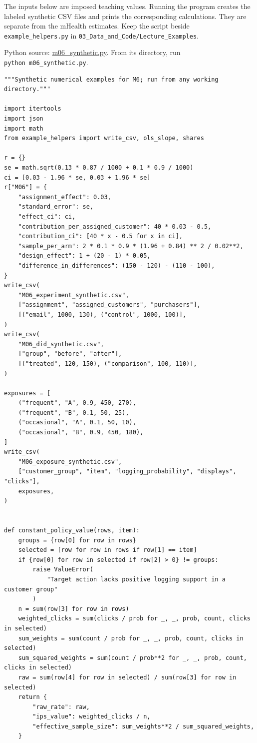 \noindent The inputs below are imposed teaching values. Running the program
creates the labeled synthetic CSV files and prints the corresponding
calculations. They are separate from the mHealth estimates. Keep the
script beside \texttt{example\_helpers.py} in
\texttt{03\_Data\_and\_Code/Lecture\_Examples}.

\FloatBarrier
{}
Python source:
\href{../03_Data_and_Code/Lecture_Examples/m06_synthetic.py}{m06\_synthetic.py}.
From its directory, run \texttt{python\ m06\_synthetic.py}.

\begin{Verbatim}[breaklines,breakanywhere,fontsize=\small]
"""Synthetic numerical examples for M6; run from any working directory."""

import itertools
import json
import math
from example_helpers import write_csv, ols_slope, shares

r = {}
se = math.sqrt(0.13 * 0.87 / 1000 + 0.1 * 0.9 / 1000)
ci = [0.03 - 1.96 * se, 0.03 + 1.96 * se]
r["M06"] = {
    "assignment_effect": 0.03,
    "standard_error": se,
    "effect_ci": ci,
    "contribution_per_assigned_customer": 40 * 0.03 - 0.5,
    "contribution_ci": [40 * x - 0.5 for x in ci],
    "sample_per_arm": 2 * 0.1 * 0.9 * (1.96 + 0.84) ** 2 / 0.02**2,
    "design_effect": 1 + (20 - 1) * 0.05,
    "difference_in_differences": (150 - 120) - (110 - 100),
}
write_csv(
    "M06_experiment_synthetic.csv",
    ["assignment", "assigned_customers", "purchasers"],
    [("email", 1000, 130), ("control", 1000, 100)],
)
write_csv(
    "M06_did_synthetic.csv",
    ["group", "before", "after"],
    [("treated", 120, 150), ("comparison", 100, 110)],
)

exposures = [
    ("frequent", "A", 0.9, 450, 270),
    ("frequent", "B", 0.1, 50, 25),
    ("occasional", "A", 0.1, 50, 10),
    ("occasional", "B", 0.9, 450, 180),
]
write_csv(
    "M06_exposure_synthetic.csv",
    ["customer_group", "item", "logging_probability", "displays", "clicks"],
    exposures,
)


def constant_policy_value(rows, item):
    groups = {row[0] for row in rows}
    selected = [row for row in rows if row[1] == item]
    if {row[0] for row in selected if row[2] > 0} != groups:
        raise ValueError(
            "Target action lacks positive logging support in a customer group"
        )
    n = sum(row[3] for row in rows)
    weighted_clicks = sum(clicks / prob for _, _, prob, count, clicks in selected)
    sum_weights = sum(count / prob for _, _, prob, count, clicks in selected)
    sum_squared_weights = sum(count / prob**2 for _, _, prob, count, clicks in selected)
    raw = sum(row[4] for row in selected) / sum(row[3] for row in selected)
    return {
        "raw_rate": raw,
        "ips_value": weighted_clicks / n,
        "effective_sample_size": sum_weights**2 / sum_squared_weights,
    }



\end{Verbatim}
